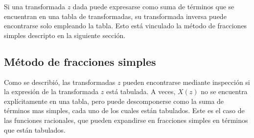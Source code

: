 \documentclass[a4paper]{report}
\begin{document}
Si una transformada \(z\) dada puede expresarse como suma de términos que se encuentran en una tabla de transformadas, su transformada inversa puede encontrarse solo empleando la tabla. Esto está vinculado la método de fracciones simples descripto en la siguiente sección. 
 
\subsection{Método de fracciones simples}\label{sec:z_transform_partial_fraction_expansion} 
 
Como se describió, las transformadas \(z\) pueden encontrarse mediante inspección si la expresión de la transformada \(z\) está tabulada. A veces, \(X(z)\) no se encuentra explícitamente en una tabla, pero puede descomponerse como la suma de términos mas simples, cada uno de los cuales están tabulados. Este es el caso de las funciones racionales, que pueden expandirse en fracciones simples en términos que están tabulados. 
\end{document}
